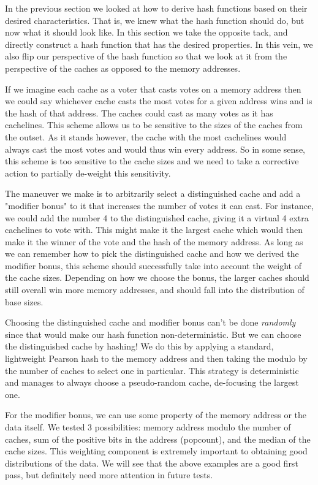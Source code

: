 In the previous section we looked at how to derive hash functions based on their
desired characteristics. That is, we knew what the hash function should do, but
now what it should look like. In this section we take the opposite tack, and
directly construct a hash function that has the desired properties. In this
vein, we also flip our perspective of the hash function so that we look at it
from the perspective of the caches as opposed to the memory addresses.

If we imagine each cache as a voter that casts votes on a memory address then we
could say whichever cache casts the most votes for a given address wins and is
the hash of that address. The caches could cast as many votes as it has
cachelines. This scheme allows us to be sensitive to the sizes of the caches
from the outset. As it stands however, the cache with the most cachelines would
always cast the most votes and would thus win every address.  So in some sense,
this scheme is too sensitive to the cache sizes and we need to take a corrective
action to partially de-weight this sensitivity.

The maneuver we make is to arbitrarily select a distinguished cache and add a
"modifier bonus" to it that increases the number of votes it can cast. For
instance, we could add the number 4 to the distinguished cache, giving it a
virtual 4 extra cachelines to vote with. This might make it the largest cache
which would then make it the winner of the vote and the hash of the memory
address. As long as we can remember how to pick the distinguished cache and how
we derived the modifier bonus, this scheme should successfully take into account
the weight of the cache sizes. Depending on how we choose the bonus, the larger
caches should still overall win more memory addresses, and should fall into the
distribution of base sizes.

Choosing the distinguished cache and modifier bonus can't be done
\textit{randomly} since that would make our hash function non-deterministic. But
we can choose the distinguished cache by hashing! We do this by applying a
standard, lightweight Pearson hash to the memory address and then taking the
modulo by the number of caches to select one in particular. This strategy is
deterministic and manages to always choose a pseudo-random cache, de-focusing
the largest one.

For the modifier bonus, we can use some property of the memory address or the
data itself. We tested 3 possibilities: memory address modulo the number of
caches, sum of the positive bits in the address (popcount), and the median of
the cache sizes. This weighting component is extremely important to obtaining
good distributions of the data. We will see that the above examples are a good
first pass, but definitely need more attention in future tests.  

